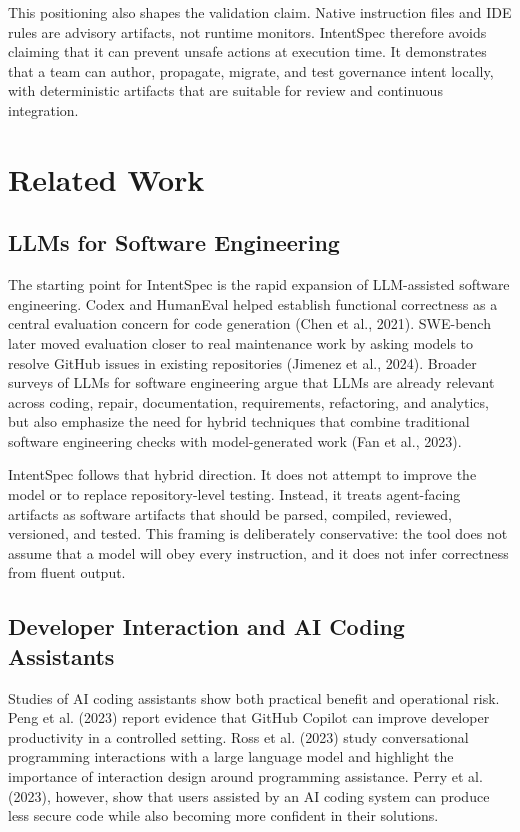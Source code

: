 \documentclass[11pt]{article}
\begin{document}
This positioning also shapes the validation claim. Native instruction files and IDE
rules are advisory artifacts, not runtime monitors. IntentSpec therefore avoids
claiming that it can prevent unsafe actions at execution time. It demonstrates that
a team can author, propagate, migrate, and test governance intent locally, with
deterministic artifacts that are suitable for review and continuous integration.

\section{Related Work}

\subsection{LLMs for Software Engineering}

The starting point for IntentSpec is the rapid expansion of LLM-assisted software
engineering. Codex and HumanEval helped establish functional correctness as a
central evaluation concern for code generation (Chen et al., 2021). SWE-bench later
moved evaluation closer to real maintenance work by asking models to resolve GitHub
issues in existing repositories (Jimenez et al., 2024). Broader surveys of LLMs for
software engineering argue that LLMs are already relevant across coding, repair,
documentation, requirements, refactoring, and analytics, but also emphasize the need
for hybrid techniques that combine traditional software engineering checks with
model-generated work (Fan et al., 2023).

IntentSpec follows that hybrid direction. It does not attempt to improve the model
or to replace repository-level testing. Instead, it treats agent-facing artifacts as
software artifacts that should be parsed, compiled, reviewed, versioned, and tested.
This framing is deliberately conservative: the tool does not assume that a model
will obey every instruction, and it does not infer correctness from fluent output.

\subsection{Developer Interaction and AI Coding Assistants}

Studies of AI coding assistants show both practical benefit and operational risk.
Peng et al. (2023) report evidence that GitHub Copilot can improve developer
productivity in a controlled setting. Ross et al. (2023) study conversational
programming interactions with a large language model and highlight the importance of
interaction design around programming assistance. Perry et al. (2023), however,
show that users assisted by an AI coding system can produce less secure code while
also becoming more confident in their solutions.
\end{document}
